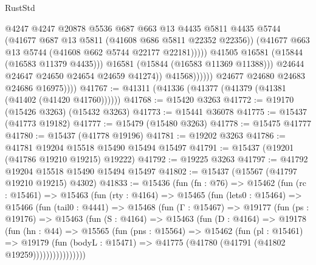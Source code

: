 \begin{lexlean}{RustStd}
\begin{coremodule}
                                      @4247
                                      @4247
                                      @20878
                                      @5536
                                      @687
                                      @663
                                      @13
                                      @4435
                                      @5811
                                      @4435
                                      @5744
                                      (@41677 @687 @13 @5811 (@41608 @686 @5811 @22352 @22356))
                                      (@41677 @663 @13 @5744 (@41608 @662 @5744 @22177 @22181)))))
                                @41505
                                @16581
                                (@15844 (@16583 @11379 @4435)))
                              @16581
                              (@15844 (@16583 @11369 @11388)))
                            @24644
                            @24647
                            @24650
                            @24654
                            @24659
                            @41274))
                        @41568))))))
            @24677
            @24680
            @24683
            @24686
            @16975))))
@41767 := @41311 (@41336 (@41377 (@41379 (@41381 (@41402 (@41420 @41760))))))
@41768 := @15420 @3263
@41772 := @19170 (@15426 @3263) (@15432 @3263)
@41773 := @15441 @36078
@41775 := @15437 (@41773 @19182)
@41777 := @15479 (@15480 @3263)
@41778 := @15475 @41777
@41780 := @15437 (@41778 @19196)
@41781 := @19202 @3263
@41786 := @41781 @19204 @15518 @15490 @15494 @15497
@41791 := @15437 (@19201 (@41786 @19210 @19215) @19222)
@41792 := @19225 @3263
@41797 := @41792 @19204 @15518 @15490 @15494 @15497
@41802 := @15437 (@15567 (@41797 @19210 @19215) @4302)
@41833 := @15436
    (fun (fn : @76) =>
    @15462
      (fun (rc : @15461) =>
      @15463
        (fun (rty : @4164) =>
        @15465
          (fun (lets0 : @15464) =>
          @15466
            (fun (tail0 : @4441) =>
            @15468
              (fun (Γ : @15467) =>
              @19177
                (fun (ps : @19176) =>
                @15463
                  (fun (S : @4164) =>
                  @15463
                    (fun (D : @4164) =>
                    @19178
                      (fun (hn : @44) =>
                      @15565
                        (fun (pns : @15564) =>
                        @15462
                          (fun (pl : @15461) =>
                          @19179
                            (fun (bodyL : @15471) =>
                            @41775 (@41780 (@41791 (@41802 @19259))))))))))))))))

\end{coremodule}
\end{lexlean}
